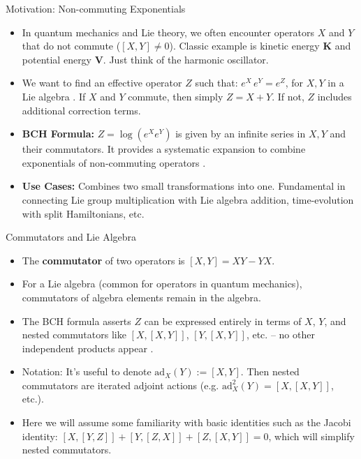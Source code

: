 \documentclass{beamer}
\begin{document}
\begin{frame}{Motivation: Non-commuting Exponentials}
\begin{itemize}
\item In quantum mechanics and Lie theory, we often encounter operators $X$ and $Y$ that do not commute ($[X,Y] \neq 0$). Classic example is kinetic energy $\bm{K}$ and potential energy $\bm{V}$. Just think of the harmonic oscillator.
\item We want to find an effective operator $Z$ such that:
$e^{X} \, e^{Y} = e^{Z}$,
for $X,Y$ in a Lie algebra . If $X$ and $Y$ commute, then simply $Z=X+Y$. If not, $Z$ includes additional correction terms.
\item \textbf{BCH Formula:} $Z = \log(e^X e^Y)$ is given by an infinite series in $X, Y$ and their commutators. It provides a systematic expansion to combine exponentials of non-commuting operators .
\item \textbf{Use Cases:} Combines two small transformations into one. Fundamental in connecting Lie group multiplication with Lie algebra addition, time-evolution with split Hamiltonians, etc.
\end{itemize}
\end{frame}

\begin{frame}{Commutators and Lie Algebra}
\begin{itemize}
\item The \textbf{commutator} of two operators is $[X,Y] = XY - YX$. 
\item For a Lie algebra (common for operators in quantum mechanics), commutators of algebra elements remain in the algebra.
\item The BCH formula asserts $Z$ can be expressed entirely in terms of $X$, $Y$, and nested commutators like $[X,[X,Y]]$, $[Y,[X,Y]]$, etc. – no other independent products appear .
\item Notation: It’s useful to denote $\mathrm{ad}_X(Y) := [X,Y]$. Then nested commutators are iterated adjoint actions (e.g. $\mathrm{ad}_X^2(Y) = [X,[X,Y]]$, etc.).
\item Here we  will assume some familiarity with basic identities  such as the Jacobi identity: $[X,[Y,Z]] + [Y,[Z,X]] + [Z,[X,Y]] = 0$, which will simplify nested commutators.
\end{itemize}
\end{frame}
\end{document}
